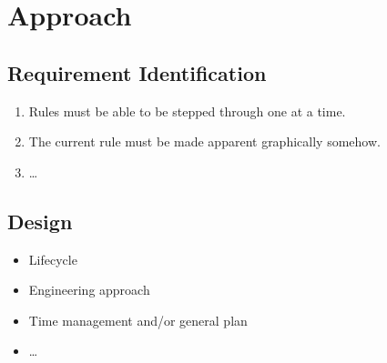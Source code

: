 \documentclass{UoYCSproject}
\begin{document}




\chapter{Approach}
\section{Requirement Identification}
\begin{enumerate}
	\item Rules must be able to be stepped through one at a time.
 	\item The current rule must be made apparent graphically somehow.
	\item \ldots
\end{enumerate}
\section{Design}
\begin{itemize}
	\item Lifecycle
 	\item Engineering approach
 	\item Time management and/or general plan
	\item \ldots
\end{itemize}
 
\end{document}
